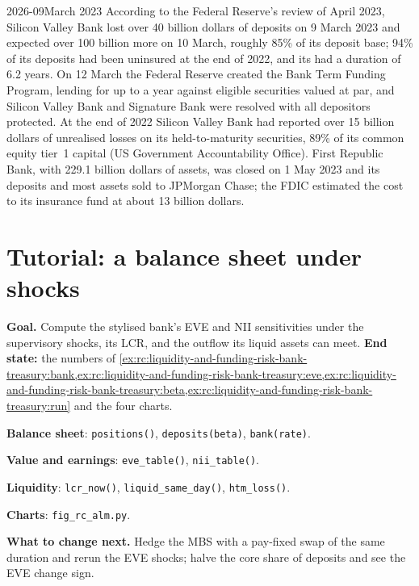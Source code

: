 \begin{dated}{2026-09}{March 2023}\label{dat:rc:liquidity-and-funding-risk-bank-treasury:svb}
According to the Federal Reserve's review of April 2023, Silicon Valley Bank lost over 40 billion
dollars of deposits on 9 March 2023 and expected over 100 billion more on 10 March, roughly 85\% of its
deposit base; 94\% of its deposits had been uninsured at the end of 2022, and its  had a duration of 6.2 years. On 12 March the Federal Reserve created the Bank Term Funding
Program, lending for up to a year against eligible securities valued at par, and Silicon Valley Bank and
Signature Bank were resolved with all depositors protected. At the end of 2022 Silicon Valley Bank had
reported over 15 billion dollars of unrealised losses on its held-to-maturity securities, 89\% of its
common equity tier~1 capital (US Government Accountability Office). First Republic Bank, with 229.1 billion
dollars of assets, was closed on 1 May 2023 and its deposits and most assets sold to JPMorgan Chase; the
FDIC estimated the cost to its insurance fund at about 13 billion dollars.
\end{dated}

\section{Tutorial: a balance sheet under shocks}\label{tut:rc:liquidity-and-funding-risk-bank-treasury:tutorial}

\begin{tutorial}
\textbf{Goal.} Compute the stylised bank's EVE and NII sensitivities under the supervisory shocks, its
LCR, and the outflow its liquid assets can meet. \textbf{End state:} the numbers of
\cref{ex:rc:liquidity-and-funding-risk-bank-treasury:bank,ex:rc:liquidity-and-funding-risk-bank-treasury:eve,ex:rc:liquidity-and-funding-risk-bank-treasury:beta,ex:rc:liquidity-and-funding-risk-bank-treasury:run}
and the four charts.
\begin{tutsteps}
\item \textbf{Balance sheet}: \texttt{positions()}, \texttt{deposits(beta)}, \texttt{bank(rate)}.
\item \textbf{Value and earnings}: \texttt{eve\_table()}, \texttt{nii\_table()}.
\item \textbf{Liquidity}: \texttt{lcr\_now()}, \texttt{liquid\_same\_day()}, \texttt{htm\_loss()}.
\item \textbf{Charts}: \texttt{fig\_rc\_alm.py}.
\end{tutsteps}
\textbf{What to change next.} Hedge the MBS with a pay-fixed swap of the same duration and rerun the
EVE shocks; halve the core share of deposits and see the EVE change sign.
\end{tutorial}

